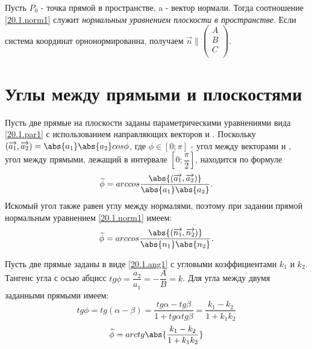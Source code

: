   Пусть $P_0$ - точка прямой в пространстве, a  - вектор нормали. Тогда соотношение \ref{20.1.norm1} служит \textit{нормальным уравнением плоскости в пространстве}. Если система координат орнонормированна, получаем $\overrightarrow{n}\parallel\left(\begin{array}{crl}
A\\
B\\
C\\
\end{array}\right)$.

\section{Углы между прямыми и плоскостями}

  Пусть две прямые на плоскости заданы параметрическими уравнениями вида \ref{20.1.par1} с использованием направляющих векторов  и . Поскольку $(\overrightarrow{a_1},\overrightarrow{a_2})=\abs{a_1}\abs{a_2}cos \phi$, где $\phi \in \left[0;\pi\right]$ - угол между векторами  и , угол между прямыми, лежащий в интервале $\left[0;\dfrac \pi 2\right]$, находится по формуле
  \begin{equation}\label{20.2.directions}
  \widetilde\phi=arccos\dfrac{\abs{(\overrightarrow{a_1},\overrightarrow{a_2})}}{\abs{a_1}\abs{a_2}}.
  \end{equation}
  Искомый угол также равен углу между нормалями, поэтому при задании прямой нормальным уравнением \ref{20.1.norm1} имеем:
  \begin{equation}\label{20.2.normals}
  \widetilde\phi=arccos\dfrac{\abs{(\overrightarrow{n_1},\overrightarrow{n_2})}}{\abs{n_1}\abs{n_2}}.
  \end{equation}
  
  Пусть две прямые заданы в виде \ref{20.1.ang1} с угловыми коэффициентами $k_1$ и $k_2$. Тангенс угла с осью абцисс $tg \phi = \dfrac{a_2}{a_1}=-\dfrac{A}{B}=k$. Для угла между двумя заданными прямыми имеем:
  \begin{equation}
  tg \phi=tg (\alpha-\beta)=\dfrac{tg \alpha - tg \beta}{1+tg \alpha tg \beta}=\dfrac{k_1-k_2}{1+k_1k_2}
  \end{equation}
  \begin{equation}\label{20.2.angles}
  \widetilde \phi = arctg \abs{\dfrac{k_1-k_2}{1+k_1k_2}}
  \end{equation}
  
